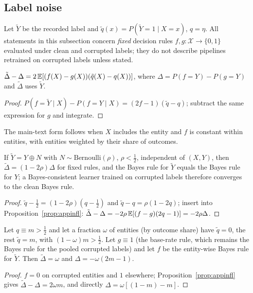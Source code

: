 \subsection{Label noise}
Let $\tilde Y$ be the recorded label and $\tilde q(x)=P(\tilde Y=1\mid X=x)$, $q=\eta$. All statements in this subsection concern \emph{fixed} decision rules $f,g:\mathcal X\to\{0,1\}$ evaluated under clean and corrupted labels; they do not describe pipelines retrained on corrupted labels unless stated.
\begin{proposition}\label{prop:appinfl}
$\tilde\Delta-\Delta=2\,\mathbb{E}[(f(X)-g(X))(\tilde q(X)-q(X))]$, where $\Delta=P(f=Y)-P(g=Y)$ and $\tilde\Delta$ uses $\tilde Y$.
\end{proposition}
\begin{proof}
$P(f=\tilde Y\mid X)-P(f=Y\mid X)=(2f-1)(\tilde q-q)$; subtract the same expression for $g$ and integrate.
\end{proof}
The main-text form follows when $X$ includes the entity and $f$ is constant within entities, with entities weighted by their share of outcomes.
\begin{proposition}\label{prop:appsym}
If $\tilde Y=Y\oplus N$ with $N\sim\mathrm{Bernoulli}(\rho)$, $\rho<\tfrac12$, independent of $(X,Y)$, then $\tilde\Delta=(1-2\rho)\Delta$ for fixed rules, and the Bayes rule for $\tilde Y$ equals the Bayes rule for $Y$; a Bayes-consistent learner trained on corrupted labels therefore converges to the clean Bayes rule.
\end{proposition}
\begin{proof}
$\tilde q-\tfrac12=(1-2\rho)(q-\tfrac12)$ and $\tilde q-q=\rho(1-2q)$; insert into Proposition~\ref{prop:appinfl}: $\tilde\Delta-\Delta=-2\rho\,\mathbb{E}[(f-g)(2q-1)]=-2\rho\Delta$.
\end{proof}
\begin{proposition}\label{prop:apprev}
Let $q\equiv m>\tfrac12$ and let a fraction $\omega$ of entities (by outcome share) have $\tilde q=0$, the rest $\tilde q=m$, with $(1-\omega)m>\tfrac12$. Let $g\equiv1$ (the base-rate rule, which remains the Bayes rule for the pooled corrupted labels) and let $f$ be the entity-wise Bayes rule for $\tilde Y$. Then $\tilde\Delta=\omega$ and $\Delta=-\omega(2m-1)$.
\end{proposition}
\begin{proof}
$f=0$ on corrupted entities and $1$ elsewhere; Proposition~\ref{prop:appinfl} gives $\tilde\Delta-\Delta=2\omega m$, and directly $\Delta=\omega[(1-m)-m]$.
\end{proof}
